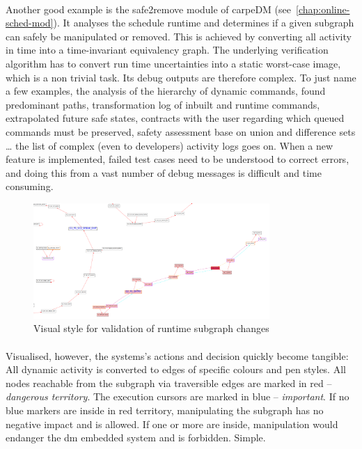 \paragraph{}
Another good example is the safe2remove module of carpeDM (see~\ref{chap:online-sched-mod}). It analyses the schedule runtime and determines if a given subgraph can safely be manipulated or removed. This is achieved by converting all activity in time into a time-invariant equivalency graph. The underlying verification algorithm has to convert run time uncertainties into a static worst-case image, which is a non trivial task. Its debug outputs are therefore complex. To just name a few examples, the analysis of the hierarchy of dynamic commands, found predominant paths, transformation log of inbuilt and runtime commands, extrapolated future safe states, contracts with the user regarding which queued commands must be preserved, safety assessment base on union and difference sets \dots{} the list of complex (even to developers) activity logs goes on. When a new feature is implemented, failed test cases need to be understood to correct errors, and doing this from a vast number of debug messages is difficult and time consuming.
\begin{figure}[H]
   \centering
   \includegraphics*[width=0.8\textwidth,keepaspectratio]{Figures/vis_debug}
   \caption{Visual style for validation of runtime subgraph changes %
    }
   \label{fig:vis_debug}
\end{figure} 
\paragraph{}
Visualised, however, the systems's actions and decision quickly become tangible: All dynamic activity is converted to edges of specific colours and pen styles. All nodes reachable from the subgraph via traversible edges are marked in red -- \emph{dangerous territory}.
The execution cursors are marked in blue -- \emph{important}. If no blue markers are inside in red territory, manipulating the subgraph has no negative impact and is allowed. If one or more are inside, manipulation would endanger the \gls{dm} embedded system and is forbidden. Simple.

